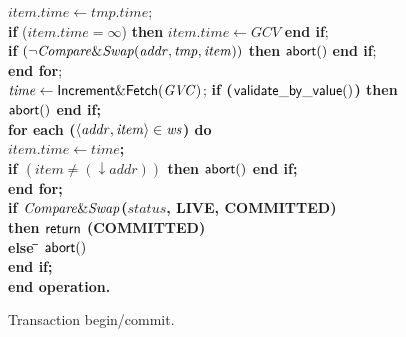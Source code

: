 \begin{figure} [htb]
{{\begin{minipage}[t]{1\linewidth}
\begin{tabbing}
 \>\> $\mathit{item.time} \gets \mathit{tmp.time}$; \\
 \>\> {\bf if} ($\mathit{item.time} = \infty$) {\bf then} $\mathit{item.time} \gets \mathit{GCV}$ {\bf end if}; \\

 \>\> {\bf if} $(\neg {\sf \mathit{Compare\&Swap}}(\mathit{addr, tmp, item}))$ {\bf then} $\sf{abort}()$ {\bf end if}; \\

 \> {\bf end for}; \\

 \> $\mathit{time} \gets {\sf Increment\&Fetch}(\mathit{GVC})$; \bf{if} (${\sf validate\_by\_value}()$) {\bf then} $\sf{abort}()$ {\bf end if}; \\




 \> 
{\bf for each} ($\left \langle \mathit{addr, item} \right \rangle  \in \mathit{ws}$) {\bf do} \\
 \>\> $\mathit{item.time} \gets \mathit{time}$; \\
 \>\> {\bf if} $(\mathit{item} \neq (\downarrow \mathit{addr}))$  
                 {\bf then}  
		    $\sf{abort}()$
                {\bf end if}; \\

 \> {\bf end for}; \\
 \> {\bf if} ${\sf \mathit{Compare\&Swap}}$($\mathit{status}$, LIVE, COMMITTED) \\
 \>\> {\bf then} \> ${\sf return}$ (COMMITTED)\\
 \> \> {\bf else} \= ${\sf abort}()$ \\
 \> {\bf end if};  \\
{\bf end operation}.

\end{tabbing}
\normalsize
\end{minipage}
}
\caption{Transaction begin/commit.}
\label{fig:tbc}
}
\end{figure}

